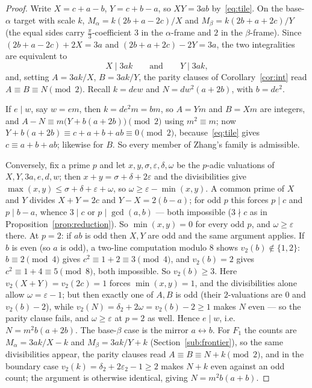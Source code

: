 \documentclass[11pt,reqno]{amsart}
\theoremstyle{plain}
\theoremstyle{definition}
\begin{document}
\begin{proof}
Write $X=c+a-b$, $Y=c+b-a$, so $XY=3ab$ by~\eqref{eq:tile}. On the base-$\alpha$ target with
scale $k$, $M_\alpha=k(2b+a-2c)/X$ and $M_\beta=k(2b+a+2c)/Y$ (the equal sides carry
$\frac\pi3$-coefficient $3$ in the $\alpha$-frame and $2$ in the $\beta$-frame). Since
$(2b+a-2c)+2X=3a$ and $(2b+a+2c)-2Y=3a$, the two integralities are equivalent to
\[
X\mid 3ak \qquad\text{and}\qquad Y\mid 3ak,
\]
and, setting $A=3ak/X$, $B=3ak/Y$, the parity clauses of Corollary~\ref{cor:int} read
$A\equiv B\equiv N\pmod 2$. Recall $k=dew$ and $N=dw^2(a+2b)$, with $b=de^2$.

If $e\mid w$, say $w=em$, then $k=de^2m=bm$, so $A=Ym$ and $B=Xm$ are integers, and
$A-N\equiv m\bigl(Y+b(a+2b)\bigr)\pmod 2$ using $m^2\equiv m$; now
$Y+b(a+2b)\equiv c+a+b+ab\equiv 0\pmod2$, because~\eqref{eq:tile} gives $c\equiv a+b+ab$;
likewise for $B$. So every member of Zhang's family is admissible.

Conversely, fix a prime $p$ and let $x,y,\sigma,\varepsilon,\delta,\omega$ be the $p$-adic
valuations of $X,Y,3a,e,d,w$; then $x+y=\sigma+\delta+2\varepsilon$ and the divisibilities give
$\max(x,y)\le\sigma+\delta+\varepsilon+\omega$, so
$\omega\ge\varepsilon-\min(x,y)$. A common prime of $X$ and $Y$ divides $X+Y=2c$ and
$Y-X=2(b-a)$; for odd $p$ this forces $p\mid c$ and $p\mid b-a$, whence $3\mid c$ or
$p\mid\gcd(a,b)$ --- both impossible ($3\nmid c$ as in Proposition~\ref{prop:reduction}). So
$\min(x,y)=0$ for every odd $p$, and $\omega\ge\varepsilon$ there. At $p=2$: if $ab$ is odd
then $X,Y$ are odd and the same argument applies. If $b$ is even (so $a$ is odd), a two-line
computation modulo $8$ shows $v_2(b)\notin\{1,2\}$: $b\equiv2\pmod4$ gives
$c^2\equiv1+2\equiv3\pmod4$, and $v_2(b)=2$ gives $c^2\equiv1+4\equiv5\pmod8$, both
impossible. So $v_2(b)\ge3$. Here $v_2(X+Y)=v_2(2c)=1$ forces $\min(x,y)=1$, and the
divisibilities alone allow $\omega=\varepsilon-1$; but then exactly one of $A,B$ is odd
(their $2$-valuations are $0$ and $v_2(b)-2$), while
$v_2(N)=\delta_2+2\omega=v_2(b)-2\ge1$ makes $N$ even --- so the parity clause fails, and
$\omega\ge\varepsilon$ at $p=2$ as well. Hence $e\mid w$, i.e.\ $N=m^2b(a+2b)$.
The base-$\beta$ case is the mirror $a\leftrightarrow b$. For $F_1$ the counts are
$M_\alpha=3ak/X-k$ and $M_\beta=3ak/Y+k$ (Section~\ref{sub:frontier}), so the same
divisibilities appear, the parity clauses read $A\equiv B\equiv N+k\pmod2$, and in the
boundary case $v_2(k)=\delta_2+2\varepsilon_2-1\ge2$ makes $N+k$ even against an odd count;
the argument is otherwise identical, giving $N=m^2b(a+b)$.
\end{proof}
\end{document}
